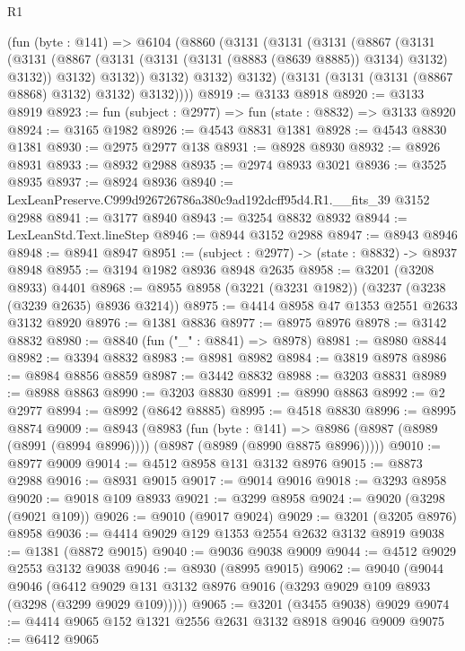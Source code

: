 \begin{lexlean}{R1}
\begin{coremodule}
      (fun (byte : @141) =>
      @6104
        (@8860
          (@3131
            (@3131
              (@3131
                (@8867
                  (@3131
                    (@3131
                      (@8867 (@3131 (@3131 (@3131 (@8883 (@8639 @8885)) @3134) @3132) @3132))
                      @3132)
                    @3132))
                @3132)
              @3132)
            @3132)
          (@3131 (@3131 (@3131 (@8867 @8868) @3132) @3132) @3132))))
@8919 := @3133 @8918
@8920 := @3133 @8919
@8923 := fun (subject : @2977) => fun (state : @8832) => @3133 @8920
@8924 := @3165 @1982
@8926 := @4543 @8831 @1381
@8928 := @4543 @8830 @1381
@8930 := @2975 @2977 @138
@8931 := @8928 @8930
@8932 := @8926 @8931
@8933 := @8932 @2988
@8935 := @2974 @8933 @3021
@8936 := @3525 @8935
@8937 := @8924 @8936
@8940 := LexLeanPreserve.C999d926726786a380c9ad192dcff95d4.R1.__fits_39 @3152 @2988
@8941 := @3177 @8940
@8943 := @3254 @8832 @8932
@8944 := LexLeanStd.Text.lineStep
@8946 := @8944 @3152 @2988
@8947 := @8943 @8946
@8948 := @8941 @8947
@8951 := (subject : @2977) -> (state : @8832) -> @8937 @8948
@8955 := @3194 @1982 @8936 @8948 @2635
@8958 := @3201 (@3208 @8933) @4401
@8968 := @8955 @8958 (@3221 (@3231 @1982)) (@3237 (@3238 (@3239 @2635) @8936 @3214))
@8975 := @4414 @8958 @47 @1353 @2551 @2633 @3132 @8920
@8976 := @1381 @8836
@8977 := @8975 @8976
@8978 := @3142 @8832
@8980 := @8840 (fun ("_" : @8841) => @8978)
@8981 := @8980 @8844
@8982 := @3394 @8832
@8983 := @8981 @8982
@8984 := @3819 @8978
@8986 := @8984 @8856 @8859
@8987 := @3442 @8832
@8988 := @3203 @8831
@8989 := @8988 @8863
@8990 := @3203 @8830
@8991 := @8990 @8863
@8992 := @2 @2977
@8994 := @8992 (@8642 @8885)
@8995 := @4518 @8830
@8996 := @8995 @8874
@9009 := @8943
    (@8983
      (fun (byte : @141) =>
      @8986 (@8987 (@8989 (@8991 (@8994 @8996)))) (@8987 (@8989 (@8990 @8875 @8996)))))
@9010 := @8977 @9009
@9014 := @4512 @8958 @131 @3132 @8976
@9015 := @8873 @2988
@9016 := @8931 @9015
@9017 := @9014 @9016
@9018 := @3293 @8958
@9020 := @9018 @109 @8933
@9021 := @3299 @8958
@9024 := @9020 (@3298 (@9021 @109))
@9026 := @9010 (@9017 @9024)
@9029 := @3201 (@3205 @8976) @8958
@9036 := @4414 @9029 @129 @1353 @2554 @2632 @3132 @8919
@9038 := @1381 (@8872 @9015)
@9040 := @9036 @9038 @9009
@9044 := @4512 @9029 @2553 @3132 @9038
@9046 := @8930 (@8995 @9015)
@9062 := @9040
    (@9044
      @9046
      (@6412 @9029 @131 @3132 @8976 @9016 (@3293 @9029 @109 @8933 (@3298 (@3299 @9029 @109)))))
@9065 := @3201 (@3455 @9038) @9029
@9074 := @4414 @9065 @152 @1321 @2556 @2631 @3132 @8918 @9046 @9009
@9075 := @6412 @9065

\end{coremodule}
\end{lexlean}
